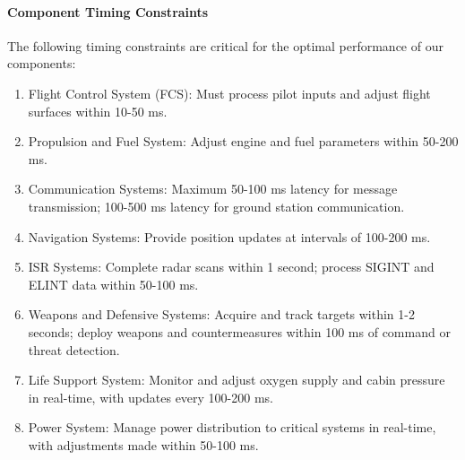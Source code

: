 \documentclass[a4paper,11pt]{article}
\begin{document}
	\paragraph{Component Timing Constraints}
	The following timing constraints are critical for the optimal performance of our components:
	\begin{enumerate}[label=T\arabic*)]
		\item Flight Control System (FCS): Must process pilot inputs and adjust flight surfaces within 10-50 ms.
		\item Propulsion and Fuel System: Adjust engine and fuel parameters within 50-200 ms.
		\item Communication Systems: Maximum 50-100 ms latency for message transmission; 100-500 ms latency for ground station communication.
		\item Navigation Systems: Provide position updates at intervals of 100-200 ms.
		\item ISR Systems: Complete radar scans within 1 second; process SIGINT and ELINT data within 50-100 ms.
		\item Weapons and Defensive Systems: Acquire and track targets within 1-2 seconds; deploy weapons and countermeasures within 100 ms of command or threat detection.
		\item Life Support System: Monitor and adjust oxygen supply and cabin pressure in real-time, with updates every 100-200 ms.
		\item Power System: Manage power distribution to critical systems in real-time, with adjustments made within 50-100 ms.
	\end{enumerate}
\end{document}
